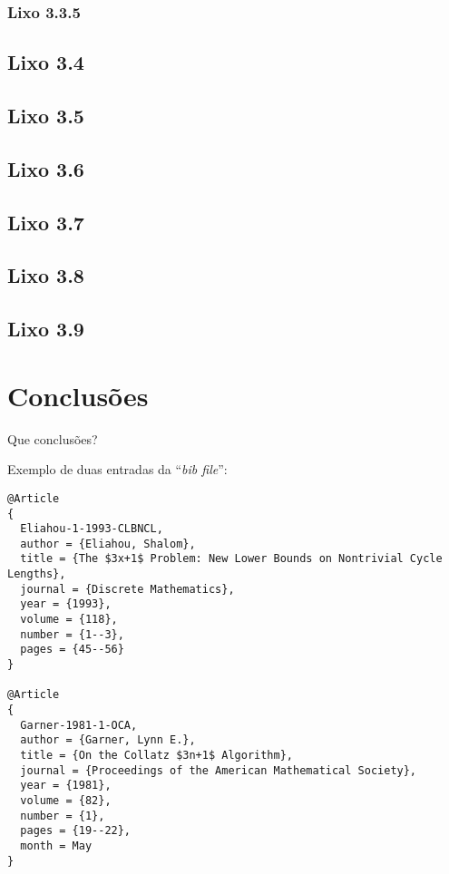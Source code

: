 \documentclass[11pt,twoside,a4paper]{report}
\begin{document}
\subsection{Lixo 3.3.5}

\section{Lixo 3.4}

\section{Lixo 3.5}

\section{Lixo 3.6}

\section{Lixo 3.7}

\section{Lixo 3.8}

\section{Lixo 3.9}


\cleardoublepage
\chapter{Conclus\~ oes}

Que conclus\~oes?

Exemplo de duas entradas da ``\textit{bib file}'':

{\footnotesize
\begin{verbatim}
@Article
{
  Eliahou-1-1993-CLBNCL,
  author = {Eliahou, Shalom},
  title = {The $3x+1$ Problem: New Lower Bounds on Nontrivial Cycle Lengths},
  journal = {Discrete Mathematics},
  year = {1993},
  volume = {118},
  number = {1--3},
  pages = {45--56}
}

@Article
{
  Garner-1981-1-OCA,
  author = {Garner, Lynn E.},
  title = {On the Collatz $3n+1$ Algorithm},
  journal = {Proceedings of the American Mathematical Society},
  year = {1981},
  volume = {82},
  number = {1},
  pages = {19--22},
  month = May
}
\end{verbatim}
}
\end{document}
